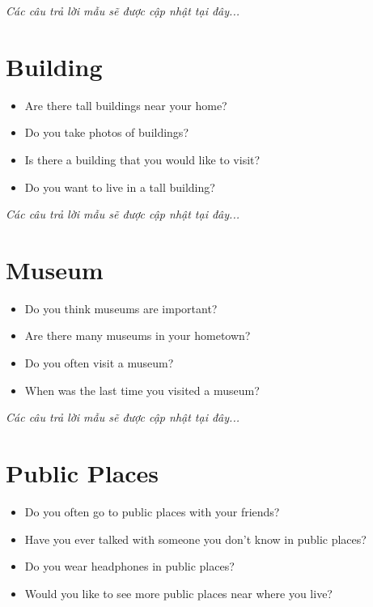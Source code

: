 \vspace{1em}
\textit{Các câu trả lời mẫu sẽ được cập nhật tại đây...}
\vspace{2em}

\section{Building}
\begin{ieltsprompt}
\begin{itemize}[itemsep=4pt]
    \item Are there tall buildings near your home?
    \item Do you take photos of buildings?
    \item Is there a building that you would like to visit?
    \item Do you want to live in a tall building?
\end{itemize}
\end{ieltsprompt}

\vspace{1em}
\textit{Các câu trả lời mẫu sẽ được cập nhật tại đây...}
\vspace{2em}

\section{Museum}
\begin{ieltsprompt}
\begin{itemize}[itemsep=4pt]
    \item Do you think museums are important?
    \item Are there many museums in your hometown?
    \item Do you often visit a museum?
    \item When was the last time you visited a museum?
\end{itemize}
\end{ieltsprompt}

\vspace{1em}
\textit{Các câu trả lời mẫu sẽ được cập nhật tại đây...}
\vspace{2em}

\section{Public Places}
\begin{ieltsprompt}
\begin{itemize}[itemsep=4pt]
    \item Do you often go to public places with your friends?
    \item Have you ever talked with someone you don't know in public places?
    \item Do you wear headphones in public places?
    \item Would you like to see more public places near where you live?
\end{itemize}
\end{ieltsprompt}

